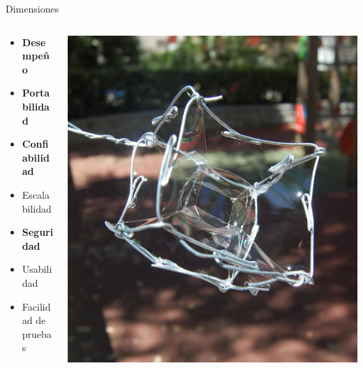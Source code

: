 \documentclass[aspectratio=169]{beamer}
\begin{document}
\begin{frame}{Dimensiones}
\begin{columns}[T]
	\begin{column}[T]{5cm}
		\begin{itemize}
			\item \textbf{Desempeño}
			\item \textbf{Portabilidad}
			\item \textbf{Confiabilidad}
			\item Escalabilidad
			\item \textbf{Seguridad}
			\item Usabilidad
			\item Facilidad de pruebas
		\end{itemize}
	\end{column}
	\begin{column}[T]{5cm} %
		\includegraphics[width=\linewidth]{Images/teseracto}
	\end{column}
\end{columns}
\end{frame}
\end{document}
